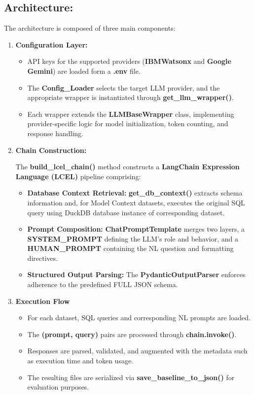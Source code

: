 \documentclass[12pt,a4paper]{article}
\begin{document}
\subsection{Architecture:}
The architecture is composed of three main components:
\begin{enumerate}
    \item \textbf{Configuration Layer:} 
    \begin{itemize}
        \item API keys for the supported providers (\textbf{IBMWatsonx} and \textbf{Google Gemini}) are loaded form a \textbf{.env} file.
        \item The \textbf{Config\_Loader} selects the target LLM provider, and the appropriate wrapper is instantiated through \textbf{get\_llm\_wrapper()}.
        \item Each wrapper extends the \textbf{LLMBaseWrapper} class, implementing provider-specific logic for model initialization, token counting, and response handling.
    \end{itemize}
    \item \textbf{Chain Construction:}
    
    The \textbf{build\_lcel\_chain()} method constructs a \textbf{LangChain Expression Language (LCEL)} pipeline comprising:
    \begin{itemize}
        \item \textbf{Database Context Retrieval:} \textbf{get\_db\_context()} extracts schema information and, for Model Context datasets, executes the original SQL query using DuckDB database instance of corresponding dataset.
        \item \textbf{Prompt Composition:} \textbf{ChatPromptTemplate} merges two layers, a \textbf{SYSTEM\_PROMPT} defining the LLM's role and behavior, and a \textbf{HUMAN\_PROMPT} containing the NL question and formatting directives.
        \item \textbf{Structured Output Parsing:} The \textbf{PydanticOutputParser} enforces adherence to the predefined FULL JSON schema.
    \end{itemize}
    \item \textbf{Execution Flow}
    \begin{itemize}
        \item For each dataset, SQL queries and corresponding NL prompts are loaded.
        \item The \textbf{(prompt, query)} pairs  are processed through \textbf{chain.invoke()}.
        \item Responses are parsed, validated, and augmented with the metadata such as execution time and token usage.
        \item The resulting files are serialized via \textbf{save\_baseline\_to\_json()} for evaluation purposes.
    \end{itemize}
\end{enumerate}
\end{document}

